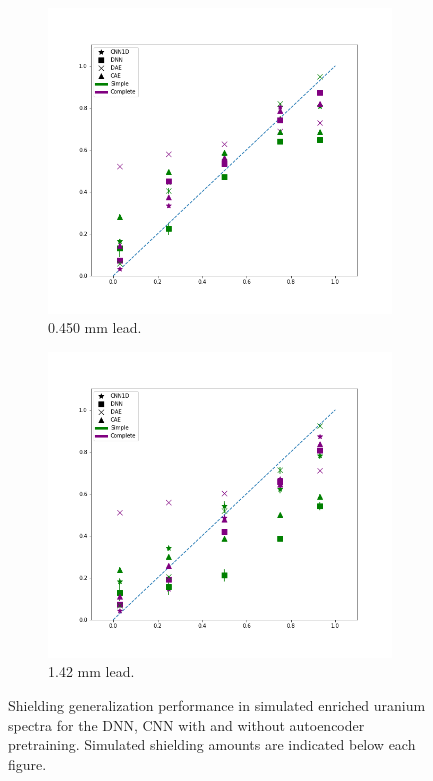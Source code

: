 \begin{figure}[H]
     \begin{subfigure}[b]{0.49\textwidth}
         \centering
         \includegraphics[width=\textwidth]{images/simuranium-mediumlead.png}
         \caption{0.450 mm lead.}
         \label{fig:simuranium-mediumlead}
     \end{subfigure}
     \hfill
     \begin{subfigure}[b]{0.49\textwidth}
         \centering
         \includegraphics[width=\textwidth]{images/simuranium-heavylead.png}
         \caption{1.42 mm lead.}
         \label{fig:simuranium-heavylead}
     \end{subfigure}
        \caption{Shielding generalization performance in simulated enriched uranium spectra for the DNN, CNN with and without autoencoder pretraining. Simulated shielding amounts are indicated below each figure.} %
        \label{fig:simuranium-shielding}
\end{figure}




